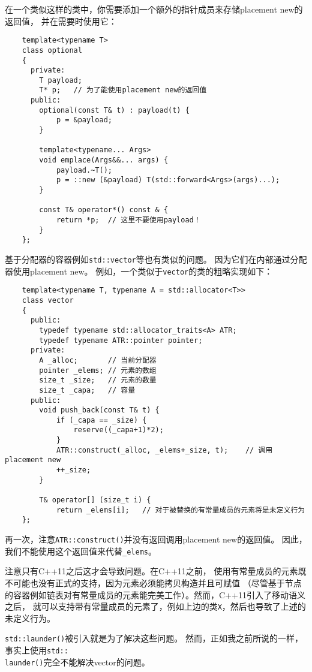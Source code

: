 在一个类似这样的类中，你需要添加一个额外的指针成员来存储placement new的返回值，
并在需要时使用它：
\begin{lstlisting}
    template<typename T>
    class optional
    {
      private:
        T payload;
        T* p;   // 为了能使用placement new的返回值
      public:
        optional(const T& t) : payload(t) {
            p = &payload;
        }

        template<typename... Args>
        void emplace(Args&&... args) {
            payload.~T();
            p = ::new (&payload) T(std::forward<Args>(args)...);
        }

        const T& operator*() const & {
            return *p;  // 这里不要使用payload！
        }
    };
\end{lstlisting}
基于分配器的容器例如\texttt{std::vector}等也有类似的问题。
因为它们在内部通过分配器使用placement new。
例如，一个类似于\texttt{vector}的类的粗略实现如下：
\begin{lstlisting}
    template<typename T, typename A = std::allocator<T>>
    class vector
    {
      public:
        typedef typename std::allocator_traits<A> ATR;
        typedef typename ATR::pointer pointer;
      private:
        A _alloc;       // 当前分配器
        pointer _elems; // 元素的数组
        size_t _size;   // 元素的数量
        size_t _capa;   // 容量
      public:
        void push_back(const T& t) {
            if (_capa == _size) {
                reserve((_capa+1)*2);
            }
            ATR::construct(_alloc, _elems+_size, t);    // 调用placement new
            ++_size;
        }

        T& operator[] (size_t i) {
            return _elems[i];   // 对于被替换的有常量成员的元素将是未定义行为
    };
\end{lstlisting}
再一次，注意\texttt{ATR::construct()}并没有返回调用placement new的返回值。
因此，我们不能使用这个返回值来代替\texttt{\_elems}。

注意只有C++11之后这才会导致问题。在C++11之前，
使用有常量成员的元素既不可能也没有正式的支持，因为元素必须能拷贝构造并且可赋值
（尽管基于节点的容器例如链表对有常量成员的元素能完美工作）。然而，C++11引入了移动语义之后，
就可以支持带有常量成员的元素了，例如上边的类\texttt{X}，然后也导致了上述的未定义行为。

\texttt{std::launder()}被引入就是为了解决这些问题。
然而，正如我之前所说的一样，事实上使用\texttt{std::\\
launder()}完全不能解决vector的问题。


